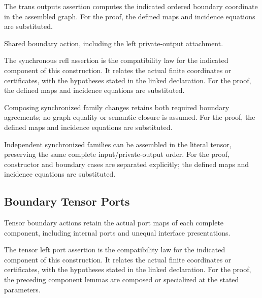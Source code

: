 The trans outputs assertion computes the indicated ordered boundary coordinate in the assembled graph.
For the proof, the defined maps and incidence equations are substituted.
\par{}

Shared boundary action, including the left private-output attachment.
\par{}

The synchronous refl assertion is the compatibility law for the indicated component of this construction. It relates the actual finite coordinates or certificates, with the hypotheses stated in the linked declaration.
For the proof, the defined maps and incidence equations are substituted.
\par{}

Composing synchronized family changes retains both required boundary agreements; no graph equality or semantic closure is assumed.
For the proof, the defined maps and incidence equations are substituted.
\par{}

Independent synchronized families can be assembled in the literal tensor, preserving the same complete input/private-output order.
For the proof, constructor and boundary cases are separated explicitly; the defined maps and incidence equations are substituted.
\par{}

\subsection{Boundary Tensor Ports}
Tensor boundary actions retain the actual port maps of each complete component, including internal ports and unequal interface presentations.

The tensor left port assertion is the compatibility law for the indicated component of this construction. It relates the actual finite coordinates or certificates, with the hypotheses stated in the linked declaration.
For the proof, the preceding component lemmas are composed or specialized at the stated parameters.
\par{}

